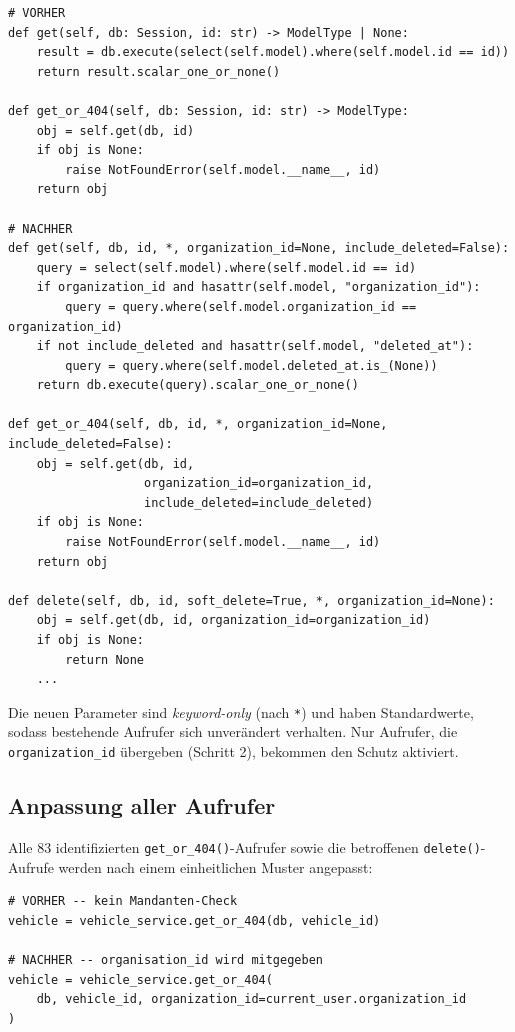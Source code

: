 \begin{lstlisting}[style=custompython, caption={base.py -- gepatchte Methoden get(), get\_or\_404() und delete()}]
# VORHER
def get(self, db: Session, id: str) -> ModelType | None:
    result = db.execute(select(self.model).where(self.model.id == id))
    return result.scalar_one_or_none()

def get_or_404(self, db: Session, id: str) -> ModelType:
    obj = self.get(db, id)
    if obj is None:
        raise NotFoundError(self.model.__name__, id)
    return obj

# NACHHER
def get(self, db, id, *, organization_id=None, include_deleted=False):
    query = select(self.model).where(self.model.id == id)
    if organization_id and hasattr(self.model, "organization_id"):
        query = query.where(self.model.organization_id == organization_id)
    if not include_deleted and hasattr(self.model, "deleted_at"):
        query = query.where(self.model.deleted_at.is_(None))
    return db.execute(query).scalar_one_or_none()

def get_or_404(self, db, id, *, organization_id=None, include_deleted=False):
    obj = self.get(db, id,
                   organization_id=organization_id,
                   include_deleted=include_deleted)
    if obj is None:
        raise NotFoundError(self.model.__name__, id)
    return obj

def delete(self, db, id, soft_delete=True, *, organization_id=None):
    obj = self.get(db, id, organization_id=organization_id)
    if obj is None:
        return None
    ...
\end{lstlisting}

Die neuen Parameter sind \emph{keyword-only} (nach \texttt{*})
und haben Standardwerte, sodass bestehende Aufrufer sich unverändert verhalten.
Nur Aufrufer, die
\texttt{organization\_id} übergeben (Schritt 2), bekommen den Schutz aktiviert.

\subsection{Anpassung aller Aufrufer}
\label{sec:patch-callers}

Alle 83 identifizierten \texttt{get\_or\_404()}-Aufrufer sowie die
betroffenen \texttt{delete()}-Aufrufe werden nach einem einheitlichen Muster angepasst:

\begin{lstlisting}[style=custompython, caption={Aufruf-Muster vor und nach dem Patch (Beispiel: Fahrzeug-Endpunkt)}]
# VORHER -- kein Mandanten-Check
vehicle = vehicle_service.get_or_404(db, vehicle_id)

# NACHHER -- organisation_id wird mitgegeben
vehicle = vehicle_service.get_or_404(
    db, vehicle_id, organization_id=current_user.organization_id
)
\end{lstlisting}

